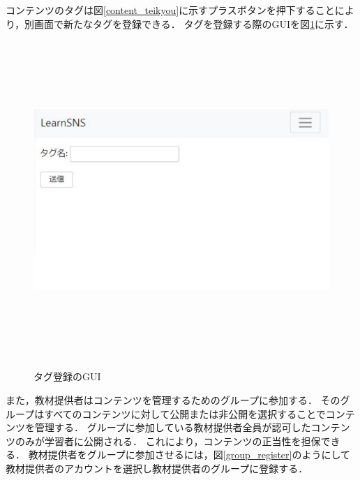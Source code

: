 \newpage
コンテンツのタグは図\ref{content_teikyou}に示すプラスボタンを押下することにより，別画面で新たなタグを登録できる．
タグを登録する際のGUIを図\ref{tag}に示す．
\begin{figure}[htbp]
    \begin{center}
        \includegraphics[width=13cm,height=12cm,keepaspectratio]{tag-crop.pdf}\\
    \end{center}
    \caption{タグ登録のGUI}
    \label{tag}
\end{figure}

\newpage
また，教材提供者はコンテンツを管理するためのグループに参加する．
そのグループはすべてのコンテンツに対して公開または非公開を選択することでコンテンツを管理する．
グループに参加している教材提供者全員が認可したコンテンツのみが学習者に公開される．
これにより，コンテンツの正当性を担保できる．
教材提供者をグループに参加させるには，図\ref{group_register}のようにして教材提供者のアカウントを選択し教材提供者のグループに登録する．

